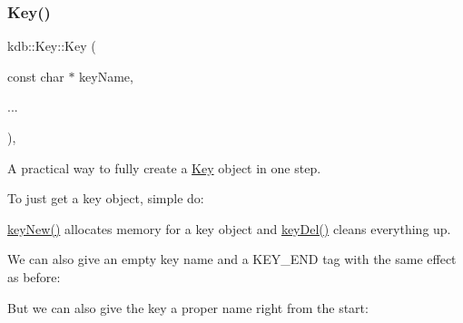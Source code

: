 \subsubsection{\texorpdfstring{Key()}{Key()}\hspace{0.1cm}{\footnotesize\ttfamily [5/7]}}
{\footnotesize\ttfamily kdb\+::\+Key\+::\+Key (\begin{DoxyParamCaption}\item[{const char $\ast$}]{key\+Name,  }\item[{}]{... }\end{DoxyParamCaption})\hspace{0.3cm}{\ttfamily [inline]}, {\ttfamily [explicit]}}



A practical way to fully create a \mbox{\hyperlink{classkdb_1_1Key}{Key}} object in one step. 

To just get a key object, simple do\+:


\begin{DoxyCodeInclude}{0}
\DoxyCodeLine{\textcolor{comment}{// work with it}}
\end{DoxyCodeInclude}
 \mbox{\hyperlink{group__key_gad23c65b44bf48d773759e1f9a4d43b89}{key\+New()}} allocates memory for a key object and \mbox{\hyperlink{group__key_ga3df95bbc2494e3e6703ece5639be5bb1}{key\+Del()}} cleans everything up.

We can also give an empty key name and a K\+E\+Y\+\_\+\+E\+ND tag with the same effect as before\+:


\begin{DoxyCodeInclude}{0}
\DoxyCodeLine{\textcolor{comment}{// work with it}}
\end{DoxyCodeInclude}
 But we can also give the key a proper name right from the start\+:


